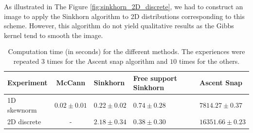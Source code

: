 As illustrated in The Figure \ref{fig:sinkhorn_2D_discrete}, we had to construct an image to apply the Sinkhorn algorithm to 2D distributions corresponding to this scheme. However, this algorithm do not yield qualitative results as the Gibbs kernel tend to smooth the image.

\begin{table}
    \begin{center}
        \begin{tabularx}{\textwidth}{>{\raggedright}m{2cm} c m{2cm} X X}
                Experiment & McCann & Sinkhorn & Free support Sinkhorn & Ascent Snap \\
                \hline\hline
                1D skewnorm & $0.02 \pm 0.01$ & $0.22 \pm 0.02$ & $0.74 \pm 0.28$ & $7814.27 \pm 0.37$ \\
                2D discrete & - & $2.18 \pm 0.34$ & $0.38 \pm 0.30$ & $16351.66 \pm 0.23$ \\
        \end{tabularx}
    \end{center}
    \caption{Computation time (in seconds) for the different methods. The experiences were repeated $3$ times for the Ascent snap algorithm and $10$ times for the others.}
    \label{table:time_table}
\end{table}



